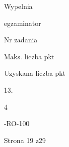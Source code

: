 \documentclass[a4paper,12pt]{article}
\begin{document}
Wypelnia

egzaminator

Nr zadania

Maks. liczba pkt

Uzyskana liczba pkt

13.

4

-RO-100

Strona 19 z29
\end{document}
